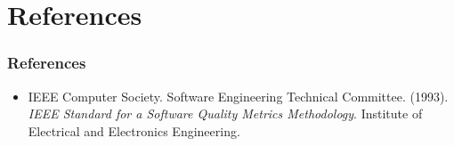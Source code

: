 \section{References}
\begin{frame}
\frametitle{References}

\begin{itemize}
  \item IEEE Computer Society. Software Engineering Technical Committee. (1993). \textit{IEEE Standard for a Software Quality Metrics Methodology}. Institute of Electrical and Electronics Engineering.
\end{itemize}

\end{frame}
